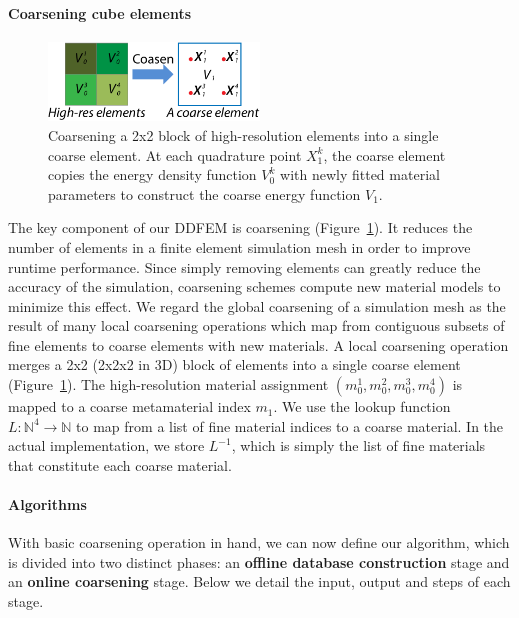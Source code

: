 \paragraph{Coarsening cube elements}
\begin{figure}[ht]
	\centering	
	\includegraphics[width=0.5\textwidth]{images/coarsen.pdf}
	\caption{Coarsening a 2x2 block of high-resolution elements into a single coarse element.
		At each quadrature point $X_1^k$, the coarse element copies the energy density function $V_0^k$ with newly fitted material parameters to construct the coarse energy function
		$V_1$.}
	\label{fig:coarsen}
\end{figure}
The key component of our DDFEM is coarsening (Figure~\ref{fig:coarsen}). It reduces the number of elements in a finite element simulation mesh in order to improve runtime performance. Since simply removing elements can greatly reduce the accuracy of the simulation, coarsening schemes compute new material models to minimize this effect.
We regard the global coarsening of a simulation mesh as the result of many local coarsening operations which map from contiguous subsets of fine elements to coarse elements with new materials.
A local coarsening operation merges a 2x2 (2x2x2 in 3D) block of elements into a single coarse element (Figure~\ref{fig:coarsen}).
The high-resolution material assignment $(m_0^1,m_0^2,m_0^3,m_0^4)$ is mapped to a coarse metamaterial index $m_1$. We use the lookup function $L:\mathbb{N}^4\rightarrow \mathbb{N}$ to map from a list of fine material indices to a coarse material. In the actual implementation, we store $L^{-1}$, which is simply the list of fine materials that constitute each coarse material.

\paragraph{Algorithms}
With basic coarsening operation in hand, we can now define our algorithm, which is divided into two distinct phases: an \textbf{offline database construction} stage and an \textbf{online coarsening} stage.
Below we detail the input, output and steps of each stage.

\noindent\hrulefill

